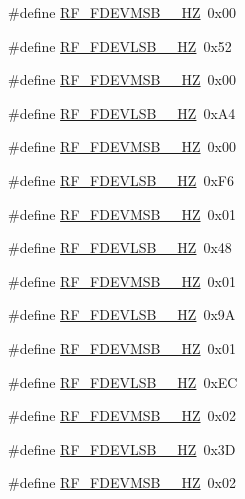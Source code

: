 \begin{DoxyCompactItemize}
\item 
\#define \hyperlink{sx1276Regs-Fsk_8h_ae6ae0e5b1aa1a2bdd92b3c9fccdb533c}{R\+F\+\_\+\+F\+D\+E\+V\+M\+S\+B\+\_\+\_\+\+HZ}~0x00
\item 
\#define \hyperlink{sx1276Regs-Fsk_8h_adafffdefc88466fdb255869839356960}{R\+F\+\_\+\+F\+D\+E\+V\+L\+S\+B\+\_\+\_\+\+HZ}~0x52
\item 
\#define \hyperlink{sx1276Regs-Fsk_8h_a687bcf3879dd873acbd21cba5b7142c5}{R\+F\+\_\+\+F\+D\+E\+V\+M\+S\+B\+\_\+\_\+\+HZ}~0x00
\item 
\#define \hyperlink{sx1276Regs-Fsk_8h_a0751e1ea52818613b7a5e3476607f646}{R\+F\+\_\+\+F\+D\+E\+V\+L\+S\+B\+\_\+\_\+\+HZ}~0x\+A4
\item 
\#define \hyperlink{sx1276Regs-Fsk_8h_a91093fabca4892b315095dc0283828c7}{R\+F\+\_\+\+F\+D\+E\+V\+M\+S\+B\+\_\+\_\+\+HZ}~0x00
\item 
\#define \hyperlink{sx1276Regs-Fsk_8h_a5331d1f2a7cd8c568218d901d2a388ce}{R\+F\+\_\+\+F\+D\+E\+V\+L\+S\+B\+\_\+\_\+\+HZ}~0x\+F6
\item 
\#define \hyperlink{sx1276Regs-Fsk_8h_ada7253b158b4a51d4a8621eff8d3aa59}{R\+F\+\_\+\+F\+D\+E\+V\+M\+S\+B\+\_\+\_\+\+HZ}~0x01
\item 
\#define \hyperlink{sx1276Regs-Fsk_8h_a6e922112d9f9ada8500acab833bec19d}{R\+F\+\_\+\+F\+D\+E\+V\+L\+S\+B\+\_\+\_\+\+HZ}~0x48
\item 
\#define \hyperlink{sx1276Regs-Fsk_8h_a93a967f33b1732e004831862b3d4964f}{R\+F\+\_\+\+F\+D\+E\+V\+M\+S\+B\+\_\+\_\+\+HZ}~0x01
\item 
\#define \hyperlink{sx1276Regs-Fsk_8h_a391d42e4ff6fa112df9198fb1a1803fe}{R\+F\+\_\+\+F\+D\+E\+V\+L\+S\+B\+\_\+\_\+\+HZ}~0x9A
\item 
\#define \hyperlink{sx1276Regs-Fsk_8h_a6b95e0d91882f1c75092a944ccdf8952}{R\+F\+\_\+\+F\+D\+E\+V\+M\+S\+B\+\_\+\_\+\+HZ}~0x01
\item 
\#define \hyperlink{sx1276Regs-Fsk_8h_a30c6d67de342780865db12984208b286}{R\+F\+\_\+\+F\+D\+E\+V\+L\+S\+B\+\_\+\_\+\+HZ}~0x\+EC
\item 
\#define \hyperlink{sx1276Regs-Fsk_8h_aae123662302055b52008db80777f3bad}{R\+F\+\_\+\+F\+D\+E\+V\+M\+S\+B\+\_\+\_\+\+HZ}~0x02
\item 
\#define \hyperlink{sx1276Regs-Fsk_8h_ae12db3f305913ae3a16466507fdd3d3c}{R\+F\+\_\+\+F\+D\+E\+V\+L\+S\+B\+\_\+\_\+\+HZ}~0x3D
\item 
\#define \hyperlink{sx1276Regs-Fsk_8h_aa12a12d2a93e1a5c35134219f35bb51c}{R\+F\+\_\+\+F\+D\+E\+V\+M\+S\+B\+\_\+\_\+\+HZ}~0x02

\end{DoxyCompactItemize}
